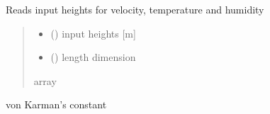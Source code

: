 \documentclass[letterpaper,10pt,english]{sphinxmanual}
\begin{document}
\begin{fulllineitems}
\label{\detokenize{users_guide:util_subs.get_heights}}
\pysigstartsignatures
{}
\pysigstopsignatures
\sphinxAtStartPar
Reads input heights for velocity, temperature and humidity
\begin{quote}\begin{description}
\begin{itemize}
\item {} 
\sphinxAtStartPar
{} () \textendash{} input heights {[}m{]}

\item {} 
\sphinxAtStartPar
{} () \textendash{} length dimension

\end{itemize}

\sphinxAtStartPar
{}

\sphinxAtStartPar
array

\end{description}\end{quote}

\end{fulllineitems}


\begin{fulllineitems}
\label{\detokenize{users_guide:util_subs.kappa}}
\pysigstartsignatures
{}
\pysigstopsignatures
\sphinxAtStartPar
von Karman’s constant

\end{fulllineitems}

\end{document}

